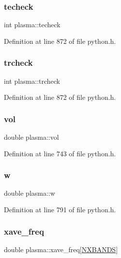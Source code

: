 \subsubsection{\texorpdfstring{techeck}{techeck}}
{\footnotesize\ttfamily int plasma\+::techeck}



Definition at line 872 of file python.\+h.

\mbox{\label{structplasma_a0a97b073aaa0261c8cd76c5ddb0e680a}} 
\subsubsection{\texorpdfstring{trcheck}{trcheck}}
{\footnotesize\ttfamily int plasma\+::trcheck}



Definition at line 872 of file python.\+h.

\mbox{\label{structplasma_a469869b2b7b2a822716ac5a3ba58412a}} 
\subsubsection{\texorpdfstring{vol}{vol}}
{\footnotesize\ttfamily double plasma\+::vol}



Definition at line 743 of file python.\+h.

\mbox{\label{structplasma_adbf9689b61e3df7611084d858b3115c0}} 
\subsubsection{\texorpdfstring{w}{w}}
{\footnotesize\ttfamily double plasma\+::w}



Definition at line 791 of file python.\+h.

\mbox{\label{structplasma_ae72cc720bc175444504be8f75d02e4c4}} 
\subsubsection{\texorpdfstring{xave\+\_\+freq}{xave\_freq}}
{\footnotesize\ttfamily double plasma\+::xave\+\_\+freq\mbox{[}\hyperlink{python_8h_ac640b7fc429348ef2f6781704d3c5163}{N\+X\+B\+A\+N\+DS}\mbox{]}}



